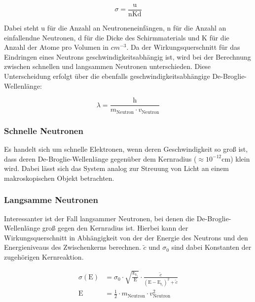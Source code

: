\documentclass[titlepage = firstcover]{scrartcl}
\begin{document}
            \begin{equation*}
                \sigma = \frac{\text{u}}{\text{nKd}}
            \end{equation*}

            \noindent
            Dabei steht u für die Anzahl an Neutroneneinfängen, n für die Anzahl an einfallendne Neutronen, d für die Dicke des Schirmmaterials und K für die Anzahl der Atome pro Volumen in $cm^{-3}$.
            Da der Wirkungsquerschnitt für das Eindringen eines Neutrons geschwindigkeitsabhängig ist, wird bei der Berechnung zwischen schnellen und langsammen Neutronen unterschieden. Diese 
            Unterscheidung erfolgt über die ebenfalls geschwindigkeitsabhängige De-Broglie-Wellenlänge:

            \begin{equation*}
                \lambda = \frac{\text{h}}{m_{\text{Neutron}} \cdot v_{\text{Neutron}}}
            \end{equation*}

            \noindent

            \subsubsection*{Schnelle Neutronen}
                Es handelt sich um schnelle Elektronen, wenn deren Geschwindigkeit so groß ist, dass deren De-Broglie-Wellenlänge gegenüber dem Kernradius ($\approx 10^{-12}$cm) klein wird. Dabei 
                lässt sich das System analog zur Streuung von Licht an einem makroskopischen Objekt betrachten.

            \subsubsection*{Langsamme Neutronen}
                Interessanter ist der Fall langsammer Neutronen, bei denen die De-Broglie-Wellenlänge groß gegen den Kernradius ist. Hierbei kann der Wirkungsquerschnitt in Abhängigkeit von der 
                der Energie des Neutrons und den Energieniveaus des Zwischenkerns berechnen. $\widetilde{c}$ und $\sigma_0$ sind dabei Konstanten der zugehörigen Kernreaktion.

                \begin{align*}
                    \sigma(\text{E}) &= \sigma_0 \cdot \sqrt{\frac{\text{E}_{\text{r}_i}}{\text{E}}} \cdot \frac{\widetilde{c}}{\left(\text{E} - \text{E}_{\text{r}_i}\right)^2 + \widetilde{c}}\\
                    \text{E} &= \frac{1}{2} \cdot m_{\text{Neutron}} \cdot v_{\text{Neutron}}^2
                \end{align*}
\end{document}
